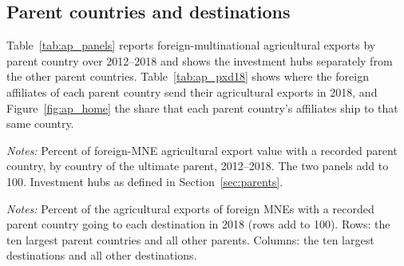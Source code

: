 \subsection{Parent countries and destinations}
Table~\ref{tab:ap_panels} reports foreign-multinational agricultural exports by parent country over 2012--2018 and shows the investment hubs separately from the other parent countries. Table~\ref{tab:ap_pxd18} shows where the foreign affiliates of each parent country send their agricultural exports in 2018, and Figure~\ref{fig:ap_home} the share that each parent country's affiliates ship to that same country.
\begin{table}[htbp]
\centering
\caption{Foreign-multinational agricultural exports, by parent country: other countries and investment hubs}
\label{tab:ap_panels}
{\small\setlength{\tabcolsep}{4pt}\setlength{\extrarowheight}{1pt}
}

\begin{minipage}{0.95\linewidth}
\notesize
\vspace{0.6em}
\textit{Notes:} Percent of foreign-MNE agricultural export value with a recorded parent country, by country of the ultimate parent, 2012--2018. The two panels add to 100. Investment hubs as defined in Section~\ref{sec:parents}.\\
\srcnote
\end{minipage}
\end{table}
\begin{table}[htbp]
\centering
\caption{Destination of foreign-multinational agricultural exports, by parent country, 2018}
\label{tab:ap_pxd18}
{\footnotesize\setlength{\tabcolsep}{3pt}\setlength{\extrarowheight}{1pt}
}

\begin{minipage}{0.95\linewidth}
\notesize
\vspace{0.6em}
\textit{Notes:} Percent of the agricultural exports of foreign MNEs with a recorded parent country going to each destination in 2018 (rows add to 100). Rows: the ten largest parent countries and all other parents. Columns: the ten largest destinations and all other destinations.\\
\srcnote
\end{minipage}
\end{table}
